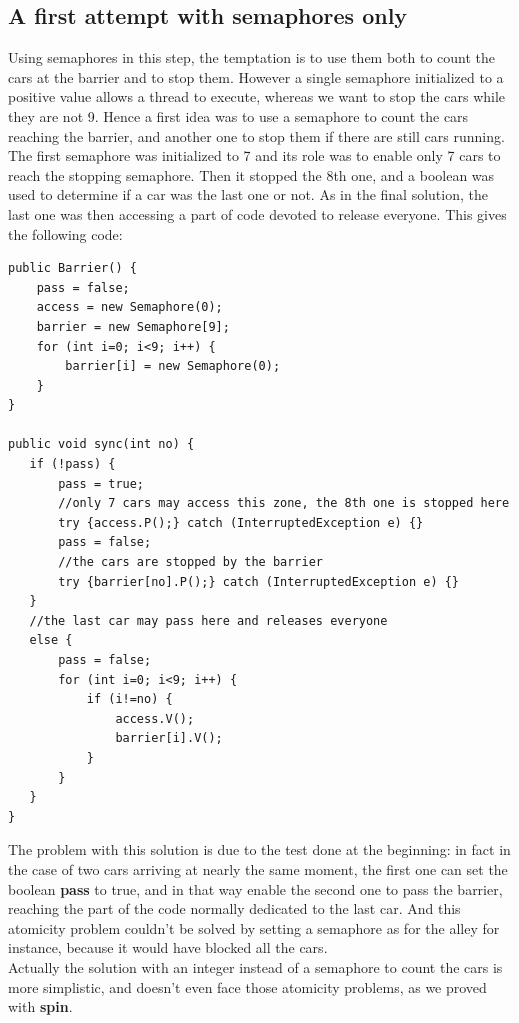 \documentclass[a4paper,12pt,twoside]{article}
\begin{document}
\subsection{A first attempt with semaphores only}
Using semaphores in this step, the temptation is to use them both to count the cars at the barrier and to stop them. However a single semaphore initialized to a positive value allows a thread to execute, whereas we want to stop the cars while they are not 9. Hence a first idea was to use a semaphore to count the cars reaching the barrier, and another one to stop them if there are still cars running. The first semaphore was initialized to 7 and its role was to enable only 7 cars to reach the stopping semaphore. Then it stopped the 8th one, and a boolean was used to determine if a car was the last one or not. As in the final solution, the last one was then accessing a part of code devoted to release everyone. This gives the following code:

\begin{verbatim}
public Barrier() {
	pass = false;
	access = new Semaphore(0);
	barrier = new Semaphore[9];
	for (int i=0; i<9; i++) {
		barrier[i] = new Semaphore(0);
	}
}

public void sync(int no) {
   if (!pass) {
	   pass = true;
	   //only 7 cars may access this zone, the 8th one is stopped here
	   try {access.P();} catch (InterruptedException e) {}
	   pass = false;
	   //the cars are stopped by the barrier
	   try {barrier[no].P();} catch (InterruptedException e) {}
   }
   //the last car may pass here and releases everyone
   else {
	   pass = false;
	   for (int i=0; i<9; i++) {
		   if (i!=no) {
			   access.V();
			   barrier[i].V();
		   }
	   }
   }
}
\end{verbatim}

\noindent The problem with this solution is due to the test done at the beginning: in fact in the case of two cars arriving at nearly the same moment, the first one can set the boolean \textbf{pass} to true, and in that way enable the second one to pass the barrier, reaching the part of the code normally dedicated to the last car. And this atomicity problem couldn't be solved by setting a semaphore as for the alley for instance, because it would have blocked all the cars.\\
Actually the solution with an integer instead of a semaphore to count the cars is more simplistic, and doesn't even face those atomicity problems, as we proved with \textbf{spin}.
\end{document}
